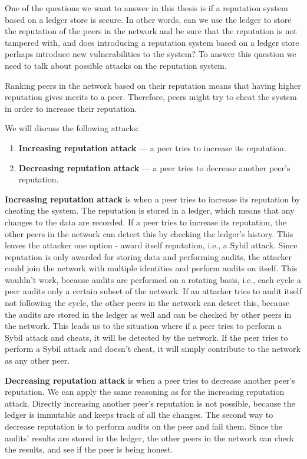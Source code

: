 One of the questions we want to answer in this thesis is if a reputation system based on a ledger store is secure.
In other words, can we use the ledger to store the reputation of the peers in the network and be sure that
the reputation is not tampered with, and
does introducing a reputation system based on a ledger store perhaps introduce new vulnerabilities to the system?
To answer this question we need to talk about possible attacks on the reputation system.

Ranking peers in the network based on their reputation means that 
having higher reputation gives merits to a peer.
Therefore, peers might try to cheat the system in order to increase their reputation.

We will discuss the following attacks:
\begin{enumerate}
    \item \textbf{Increasing reputation attack} --- a peer tries to increase its reputation.
    \item \textbf{Decreasing reputation attack} --- a peer tries to decrease another peer's reputation.
\end{enumerate}

\textbf{Increasing reputation attack} is when a peer tries to increase its reputation by
cheating the system.
The reputation is stored in a ledger, which means that any changes to the data are recorded.
If a peer tries to increase its reputation, the other peers in the network can detect this by
checking the ledger's history.
This leaves the attacker one option - award itself reputation, i.e., a Sybil attack.
Since reputation is only awarded for storing data and performing audits, the attacker could join the network
with multiple identities and perform audits on itself.
This wouldn't work, because audits are performed on a rotating basis, i.e., each cycle a peer audits only a 
certain subset of the network.
If an attacker tries to audit itself not following the cycle, the other peers in the network can detect this,
because the audits are stored in the ledger as well and can be checked by other peers in the network.
This leads us to the situation where if a peer tries to perform a Sybil attack and cheats, it will be detected by
the network.
If the peer tries to perform a Sybil attack and doesn't cheat,
it will simply contribute to the network as any other peer.

\textbf{Decreasing reputation attack} is when a peer tries to decrease another peer's reputation.
We can apply the same reasoning as for the increasing reputation attack.
Directly increasing another peer's reputation is not possible, because the ledger is immutable and keeps track of
all the changes.
The second way to decrease reputation is to perform audits on the peer and fail them.
Since the audits' results are stored in the ledger, the other peers in the network can check the results,
and see if the peer is being honest.

